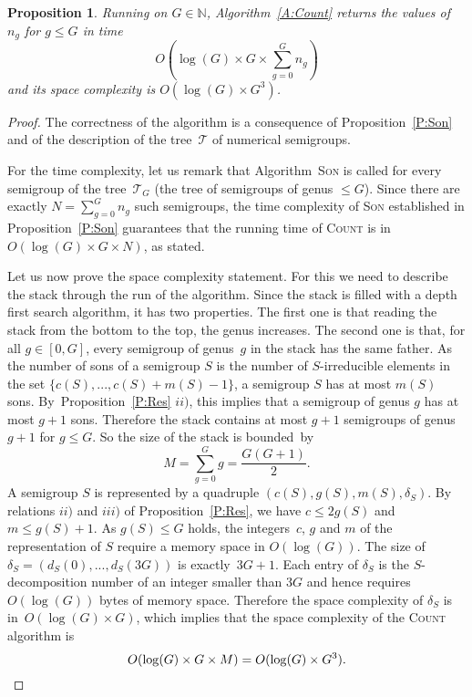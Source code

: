 \documentclass[reqno]{amsart}
\theoremstyle{plain}
\newtheorem{prop}{Proposition}[section]
\theoremstyle{definition}
\renewcommand{\leq}{\leqslant}
\newcommand{\NN}{\mathbb{N}}
\begin{document}
\begin{prop}
Running on $G\in\NN$, Algorithm~\ref{A:Count} returns the values of $n_g$ for $g\leq G$  in time
\[
O\left(\log(G)\times G \times \sum_{g=0}^G n_g\right)
\]
and its space complexity is $O(\log(G)\times G^3)$.
\end{prop}

\begin{proof}
The correctness of the algorithm is a consequence of Proposition~\ref{P:Son} and of the description of the tree~$\mathcal{T}$ of numerical semigroups.

For the time complexity, let us remark that Algorithm~\textsc{Son} is called for every semigroup of the tree~$\mathcal{T}_G$ (the tree of semigroups of genus $\leq G$). 
Since there are exactly $N=\sum_{g=0}^G n_g$ such semigroups, the time complexity of \textsc{Son} established in Proposition~\ref{P:Son} guarantees that the running time of \textsc{Count} is in~$O(\log(G)\times G\times N)$, as stated.

Let us now prove the space complexity statement.
For  this we need to describe the stack through  the run of the algorithm.
Since the stack is filled  with a depth first search algorithm, it has two properties.
The first one is that reading the stack from the bottom to the top, the genus increases.  
The second one is that, for all $g\in[0,G]$, every semigroup of genus~$g$ in the stack has the same father.
As the number of sons of a  semigroup $S$ is the number of $S$-irreducible elements in the set $\{c(S),...,c(S)+m(S)-1\}$,  a semigroup $S$ has at most $m(S)$ sons. 
By~Proposition~\ref{P:Res} $ii)$, this implies that a semigroup of genus $g$ has at most $g+1$ sons.
Therefore the stack contains at most $g+1$ semigroups of genus $g+1$ for $g\leq G$. 
So the size of the stack is bounded~by 
\[
M=\sum_{g=0}^Gg=\frac{G(G+1)}2.
\]
A semigroup $S$ is represented by a quadruple $(c(S),g(S),m(S),\delta_S)$. 
By relations $ii)$ and $iii)$ of Proposition~\ref{P:Res}, we have $c\leq 2g(S)$ and $m\leq g(S)+1$. 
As $g(S)\leq G$ holds, the integers~$c$, $g$  and $m$ of the representation of $S$ require a memory space in $O(\log(G))$. 
The size of~$\delta_S=(d_S(0),...,d_S(3G))$ is exactly~$3G+1$. 
Each entry of $\delta_S$ is the $S$-decomposition number of an integer smaller than $3G$ and hence
requires $O(\log(G))$ bytes of memory space.
Therefore the space complexity of $\delta_S$ is in~$O(\log(G)\times G)$, which implies that the space complexity of the \textsc{Count} algorithm is
\[
O(\log(G)\times G\times M)= O(\log(G)\times G^3).\qedhere
\]
\end{proof}
\end{document}
